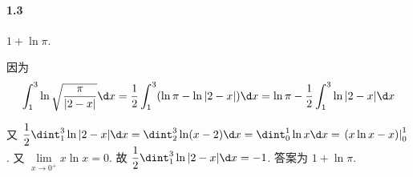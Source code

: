 \paragraph*{1.3} $1+\ln\pi$.

因为
\[
	\int_{1}^{3}\ln\sqrt{\dfrac{\pi}{|2-x|}}\d x=\dfrac{1}{2}\int_{1}^{3}(\ln \pi-\ln|2-x|)\d x=\ln\pi -\dfrac{1}{2}\int_{1}^3\ln|2-x|\d x
\]

又 $\dfrac{1}{2}\dint_{1}^{3}\ln|2-x|\d x=\dint_{2}^{3}\ln(x-2)\d x=\dint_{0}^{1}\ln x\d x=\left.(x\ln x-x)\right|_{0}^{1}$. 又 $\lim\limits_{x\to 0^{+}}x\ln x=0$. 故 $\dfrac{1}{2}\dint_{1}^{3}\ln|2-x|\d x=-1$. 答案为 $1+\ln \pi$.